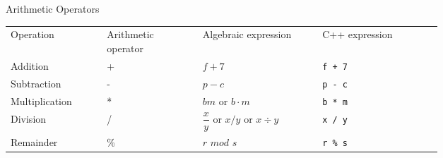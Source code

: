 \documentclass[10pt]{beamer}
\begin{document}
\begin{frame}{\small Arithmetic Operators}
	\centering\tiny\renewcommand{\arraystretch}{2}
	\begin{tabular}{p{0.15\linewidth} p{0.16\linewidth} p{0.2\linewidth} p{0.2\linewidth}}
		
		\rowcolor{cyan}\color{white} Operation & \color{white} Arithmetic operator & \color{white} Algebraic expression & \color{white} C++ expression \\
		
		\rowcolor{lightcyan} Addition & + & $f + 7$ & \texttt{f + 7} \\
		
		\rowcolor{lightcyan} Subtraction & - & $p - c$ & \texttt{p - c} \\
		
		\rowcolor{lightcyan} Multiplication & * & $bm$ or $b \cdot m$ & \texttt{b * m} \\
		
		\rowcolor{lightcyan} Division & / & $\dfrac{x}{y}$ or $x/y$ or $x\div y$ & \texttt{x / y} \\
		
		\rowcolor{lightcyan} Remainder & \% & $r$ $mod$ $s$ & \texttt{r \% s} 
	\end{tabular}
\end{frame}
\end{document}
